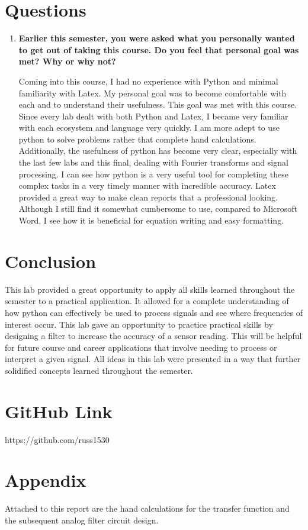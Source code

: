 \documentclass[12pt, titlepage]{article}
\begin{document}
    
   \clearpage
    \section{Questions}
    \begin{enumerate}
        \item \textbf{Earlier this semester, you were asked what you personally wanted to get out of taking this course.  Do you feel that personal goal was met?  Why or why not?}
        
        Coming into this course, I had no experience with Python and minimal familiarity with Latex.  My personal goal was to become comfortable with each and to understand their usefulness.  This goal was met with this course.  Since every lab dealt with both Python and Latex, I became very familiar with each ecosystem and language very quickly.  I am more adept to use python to solve problems rather that complete hand calculations.  Additionally, the usefulness of python has become very clear, especially with the last few labs and this final, dealing with Fourier transforms and signal processing.  I can see how python is a very useful tool for completing these complex tasks in a very timely manner with incredible accuracy.  Latex provided a great way to make clean reports that a professional looking.  Although I still find it somewhat cumbersome to use, compared to Microsoft Word, I see how it is beneficial for equation writing and easy formatting.
    \end{enumerate}
   
    
    \section{Conclusion}
    This lab provided a great opportunity to apply all skills learned throughout the semester to a practical application.  It allowed for a complete understanding of how python can effectively be used to process signals and see where frequencies of interest occur.  This lab gave an opportunity to practice practical skills by designing a filter to increase the accuracy of a sensor reading.  This will be helpful for future course and career applications that involve needing to process or interpret a given signal.  All ideas in this lab were presented in a way that further solidified concepts learned throughout the semester.
    
    
    \section{GitHub Link}
        https://github.com/russ1530
        

    \section{Appendix}
    Attached to this report are the hand calculations for the transfer function and the subsequent analog filter circuit design.
\end{document}
